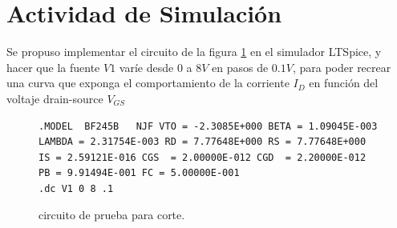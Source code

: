 \section{Actividad de Simulación}
    Se propuso implementar el circuito de la figura \ref{crkt:jfet-corte} en el simulador LTSpice, y hacer que la fuente
    $V1$ varíe desde $0$ a $8V$ en pasos de $0.1V$, para poder recrear una curva que exponga el comportamiento de la
    corriente $I_D$ en función del voltaje drain-source $V_{GS}$ 
    \begin{figure}[!ht]
      \centering
      \begin{minipage}{0.45\textwidth}
        \caption{circuito de prueba para corte.}
        \label{crkt:jfet-corte}
      \end{minipage}
      \hfill
      \begin{minipage}{0.45\textwidth}
        \begin{lstlisting}[style=ltspice, caption={Parámetros de simulación LTspice}, label=list:jfet-sat]
.MODEL  BF245B   NJF VTO = -2.3085E+000 BETA = 1.09045E-003 LAMBDA = 2.31754E-003 RD = 7.77648E+000 RS = 7.77648E+000 IS = 2.59121E-016 CGS  = 2.00000E-012 CGD  = 2.20000E-012 PB = 9.91494E-001 FC = 5.00000E-001
.dc V1 0 8 .1
        \end{lstlisting}
      \end{minipage}
    \end{figure}

